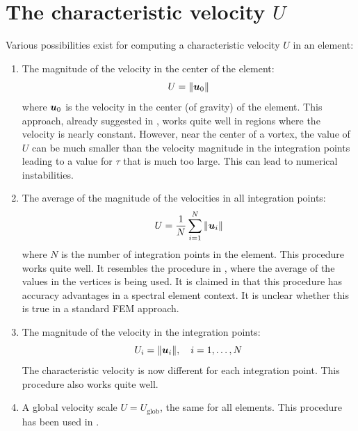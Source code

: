 \section{The characteristic velocity $U$}

Various possibilities exist for computing a characteristic velocity $U$
in an element:
\begin{enumerate}
   \item The magnitude of the velocity in the center of the element:
\[
         U = \|\boldsymbol{u}_0\|
\]
where $\boldsymbol{u}_0$ is the velocity in the center (of gravity) of the element.
This approach, already suggested in \cite{Brooks82}, works quite well in
regions where the velocity is nearly constant.
However, near the center of a vortex, the value of $U$ can be much smaller than
the velocity magnitude in the integration points leading to a value for $\tau$
that is much too large. This can lead to numerical instabilities.
   \item The average of the magnitude of the velocities in all integration
points:
\[
         U = \frac1N\sum_{i=1}^N\|\boldsymbol{u}_i\|
\]
where $N$ is the number of integration points in the element.
This procedure
works quite well. It resembles the procedure in \cite{Fan97}, where the
average of the values in the vertices is being used. It is claimed in
\cite{Fan97} that this procedure has accuracy advantages in a spectral element
context. It is unclear whether this is true in a standard FEM approach.
   \item The magnitude of the velocity in the integration points:
\[
         U_i = \|\boldsymbol{u}_i\|, \quad i=1,\dots,N
\]
The characteristic velocity is now different for each integration point. 
This procedure also works quite well.
   \item A global velocity scale $U=U_\text{glob}$, the same for all elements.
This procedure has been used in \cite{Lunsmann93}.
\end{enumerate}
